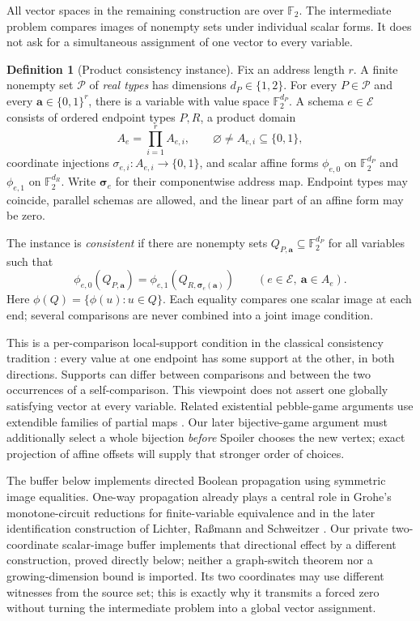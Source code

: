 \documentclass[11pt]{article}
\theoremstyle{definition}
\newtheorem{definition}[theorem]{Definition}
\newcommand{\F}{\mathbb F_2}
\begin{document}
All vector spaces in the remaining construction are over $\F$. The
intermediate problem compares images of nonempty sets under individual
scalar forms. It does not ask for a simultaneous assignment of one vector
to every variable.

\begin{definition}[Product consistency instance]
\label{def:scalar-images}
Fix an address length $r$. A finite nonempty set $\mathcal P$ of
\emph{real types} has dimensions $d_P\in\{1,2\}$. For every $P\in\mathcal P$
and every $\mathbf a\in\{0,1\}^r$, there is a variable with value space
$\F^{d_P}$. A schema $e\in\mathcal E$ consists of ordered endpoint types
$P,R$, a product domain
\[
 A_e=\prod_{i=1}^r A_{e,i},\qquad
 \varnothing\ne A_{e,i}\subseteq\{0,1\},
\]
coordinate injections $\sigma_{e,i}:A_{e,i}\to\{0,1\}$, and scalar
affine forms $\phi_{e,0}$ on $\F^{d_P}$ and $\phi_{e,1}$ on $\F^{d_R}$.
Write $\boldsymbol\sigma_e$ for their componentwise address map.
Endpoint types may coincide, parallel schemas are allowed, and the
linear part of an affine form may be zero.

The instance is \emph{consistent} if there are nonempty sets
$Q_{P,\mathbf a}\subseteq\F^{d_P}$ for all variables such that
\begin{equation}\label{eq:scalar-images}
 \phi_{e,0}(Q_{P,\mathbf a})
 =\phi_{e,1}(Q_{R,\boldsymbol\sigma_e(\mathbf a)})
 \qquad(e\in\mathcal E,\ \mathbf a\in A_e).
\end{equation}
Here $\phi(Q)=\{\phi(u):u\in Q\}$. Each equality compares one scalar
image at each end; several comparisons are never combined into a joint
image condition.
\end{definition}

This is a per-comparison local-support condition in the classical
consistency tradition \citep[Sections~4 and~6]{Mackworth1977}:
every value at one endpoint has some support at the other, in both
directions. Supports can differ between comparisons and between the
two occurrences of a self-comparison. This viewpoint does not assert
one globally satisfying vector at every variable.
Related existential pebble-game arguments use extendible families of
partial maps \citep[Definition~4]{Berkholz2013}. Our later bijective-game
argument must additionally select a whole bijection \emph{before}
Spoiler chooses the new vertex; exact projection of affine offsets
will supply that stronger order of choices.

The buffer below implements directed Boolean propagation using symmetric
image equalities. One-way propagation already plays a central role in
Grohe's monotone-circuit reductions for finite-variable equivalence
\citep[author manuscript, Lemma~14 and Section~5.4]{Grohe1999}
and in the later identification
construction of Lichter, Ra{\ss}mann and Schweitzer
\citep[Section~5]{LichterRassmannSchweitzer2025}.
Our private two-coordinate scalar-image buffer implements that directional
effect by a different construction, proved directly below; neither a
graph-switch theorem nor a growing-dimension bound is imported.
Its two coordinates may use different witnesses from
the source set; this is exactly why it transmits a forced zero without
turning the intermediate problem into a global vector assignment.
\end{document}
